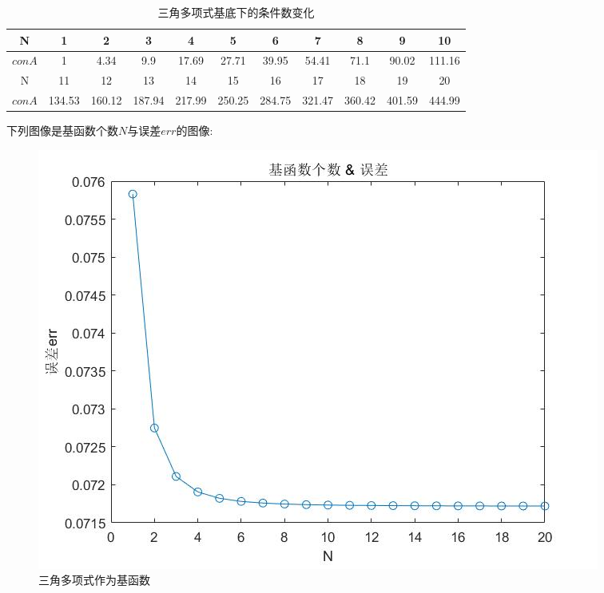 \documentclass{article}
\begin{document}
\begin{table}[h]
  \centering
    \begin{tabular}{|c|c|c|c|c|c|c|c|c|c|c|}
    \hline
    N     & 1     & 2     & 3     & 4     & 5     & 6     & 7     & 8     & 9     & 10 \\
    \hline
    $conA$ & 1     & 4.34  & 9.9   & 17.69 & 27.71 & 39.95 & 54.41 & 71.1  & 90.02 & 111.16 \\
    \hline
    N     & 11    & 12    & 13    & 14    & 15    & 16    & 17    & 18    & 19    & 20 \\
    \hline
    $conA$ & 134.53 & 160.12 & 187.94 & 217.99 & 250.25 & 284.75 & 321.47 & 360.42 & 401.59 & 444.99 \\
    \hline
    \end{tabular}
    \caption{\label{三角多项式基底下的条件数变化}三角多项式基底下的条件数变化}
\end{table}

\begin{table}[h]
  \centering
  \caption{\label{代数多项式基底下的条件数变化}代数多项式基底下的条件数变化}
  
\end{table}

\newpage
下列图像是基函数个数$N$与误差$err$的图像:
\begin{figure}[H]
\centering
\includegraphics[scale=0.4]{N_err_1.jpg}
\caption{\label{N_err_1}三角多项式作为基函数}
\end{figure}
\end{document}
